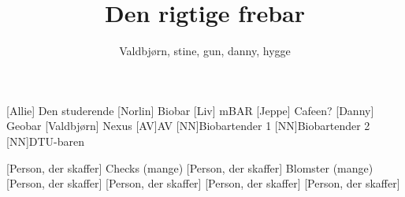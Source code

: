 \documentclass[a4paper,11pt]{article}
\title{Den rigtige frebar}
\author{Valdbjørn, stine, gun, danny, hygge}
\begin{document}
\maketitle

\begin{roles}
    [Allie] Den studerende 
    [Norlin] Biobar
    [Liv] mBAR 
    [Jeppe] Cafeen?
    [Danny] Geobar 
    [Valdbjørn] Nexus
    [AV]AV
    [NN]Biobartender 1
    [NN]Biobartender 2
    [NN]DTU-baren 
\end{roles}

\begin{props}
    [Person, der skaffer] Checks (mange)
    [Person, der skaffer] Blomster (mange)
    [Person, der skaffer] 
    [Person, der skaffer]
    [Person, der skaffer] 
    [Person, der skaffer] 
\end{props}
\end{document}
